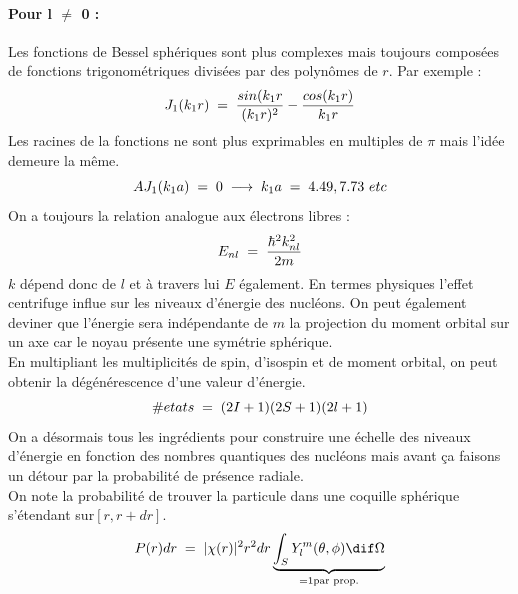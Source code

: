 \paragraph{Pour l $\neq$ 0 :} Les fonctions de Bessel sphériques sont plus complexes mais toujours composées de fonctions trigonométriques divisées par des polynômes de $r$. Par exemple :
\begin{equation*}
    J_1(k_1 r) \; = \; \dfrac{sin(k_1 r}{(k_1 r)^2} - \dfrac{cos(k_1r)}{k_1r}
\end{equation*}
Les racines de la fonctions ne sont plus exprimables en multiples de $\pi$ mais l'idée demeure la même.
\begin{equation*}
    AJ_1(k_1a) \; = \; 0 \; \longrightarrow \; k_1 a \; = \; 4.49,7.73 \ etc
\end{equation*}
On a toujours la relation analogue aux électrons libres :
\begin{equation*}
    E_{nl} \; = \; \dfrac{\hbar^2k_{nl}^2}{2m}
\end{equation*}
$k$ dépend donc de $l$ et à travers lui $E$ également. En termes physiques l'effet centrifuge influe sur les niveaux d'énergie des nucléons. On peut également deviner que l'énergie sera indépendante de $m$ la projection du moment orbital sur un axe car le noyau présente une symétrie sphérique.\\
En multipliant les multiplicités de spin, d'isospin et de moment orbital, on peut obtenir la dégénérescence d'une valeur d'énergie.
\begin{equation*}
    \#etats \; = \; (2I+1)(2S+1)(2l+1)
\end{equation*}
On a désormais tous les ingrédients pour construire une échelle des niveaux d'énergie en fonction des nombres quantiques des nucléons mais avant ça faisons un détour par la probabilité de présence radiale.\\
On note la probabilité de trouver la particule dans une coquille sphérique s'étendant sur$ [r,r+dr]$.
\begin{equation*}
    P(r)dr \eq |\chi(r)|^2 r^2 dr \underbrace{\int_S Y_l^m(\theta,\phi)\dif\Omega}_{= 1 \text{par prop.}}
\end{equation*}
